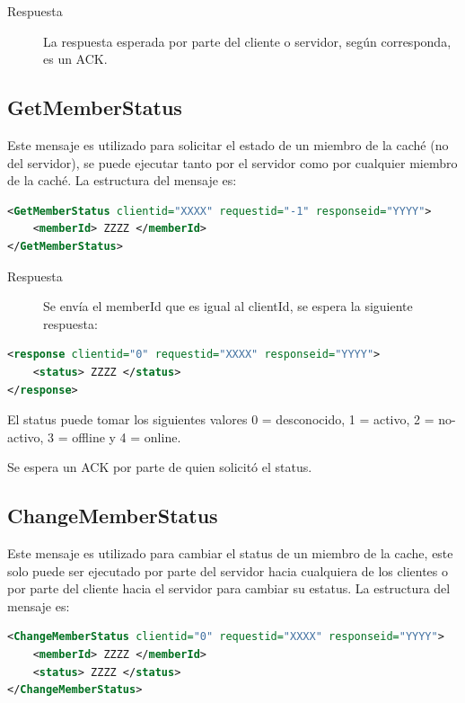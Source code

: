 \begin{description}
\item[Respuesta] La respuesta esperada por parte del cliente o servidor, según corresponda, es un ACK.
\end{description}

\subsection{GetMemberStatus}
\label{GetMemberStatus} 
Este mensaje es utilizado para solicitar el estado de un miembro de la caché (no del servidor), se puede ejecutar tanto por el servidor como por cualquier miembro de la caché. La estructura del mensaje es:

\begin{lstlisting}[language=XML,caption=Mensaje de GetMemberStatus]
<GetMemberStatus clientid="XXXX" requestid="-1" responseid="YYYY"> 
	<memberId> ZZZZ </memberId>
</GetMemberStatus>
\end{lstlisting}

\begin{description}
\item[Respuesta] Se envía el memberId que es igual al clientId, se espera la siguiente respuesta:
\end{description}

\begin{lstlisting}[language=XML,caption=Mensaje de Respuesta de GetMemberStatus]
<response clientid="0" requestid="XXXX" responseid="YYYY"> 
	<status> ZZZZ </status>
</response>
\end{lstlisting}

El status puede tomar los siguientes valores 0 = desconocido, 1 = activo, 2 = no-activo, 3 = offline y 4 = online.

Se espera un ACK por parte de quien solicitó el status.

\subsection{ChangeMemberStatus}
Este mensaje es utilizado para cambiar el status de un miembro de la cache, este solo puede ser ejecutado por parte del servidor hacia cualquiera de los clientes o  por parte del cliente hacia el servidor para cambiar su estatus. La estructura del mensaje es:

\begin{lstlisting}[language=XML,caption=Mensaje de ChangeMemberStatus]
<ChangeMemberStatus clientid="0" requestid="XXXX" responseid="YYYY"> 
	<memberId> ZZZZ </memberId>
	<status> ZZZZ </status>
</ChangeMemberStatus>
\end{lstlisting}


